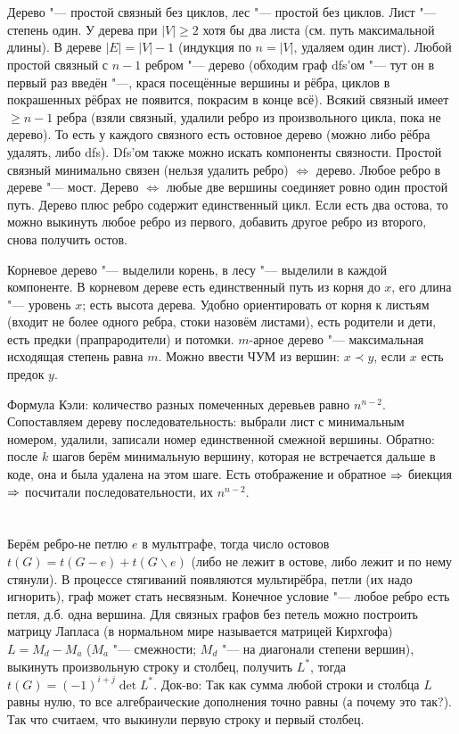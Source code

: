 \section{} %
Дерево "--- простой связный без циклов, лес "--- простой без циклов.
Лист "--- степень один.
У дерева при $|V|\ge 2$ хотя бы два листа (см. путь максимальной длины).
В дереве $|E|=|V|-1$ (индукция по $n=|V|$, удаляем один лист).
Любой простой связный с $n-1$ ребром "--- дерево (обходим граф dfs'ом "--- тут он в первый раз введён "---, крася посещённые вершины и рёбра, циклов в покрашенных
рёбрах не появится, покрасим в конце всё).
Всякий связный имеет $\ge n-1$ ребра (взяли связный, удалили ребро из произвольного цикла, пока не дерево).
То есть у каждого связного есть остовное дерево (можно либо рёбра удалять, либо dfs).
Dfs'ом также можно искать компоненты связности.
Простой связный минимально связен (нельзя удалить ребро) $\iff$ дерево.
Любое ребро в дереве "--- мост.
Дерево $\iff$ любые две вершины соединяет ровно один простой путь.
Дерево плюс ребро содержит единственный цикл.
Если есть два остова, то можно выкинуть любое ребро из первого, добавить другое ребро из второго, снова получить остов.

Корневое дерево "--- выделили корень, в лесу "--- выделили в каждой компоненте.
В корневом дереве есть единственный путь из корня до $x$, его длина "--- уровень $x$;
есть высота дерева.
Удобно ориентировать от корня к листьям (входит не более одного ребра, стоки назовём листами),
есть родители и дети, есть предки (прапрародители) и потомки.
$m$-арное дерево "--- максимальная исходящая степень равна $m$.
Можно ввести ЧУМ из вершин: $x \prec y$, если $x$ есть предок $y$.

Формула Кэли: количество разных помеченных деревьев равно $n^{n-2}$.
Сопоставляем дереву последовательность: выбрали лист с минимальным номером, удалили,
записали номер единственной смежной вершины.
Обратно: после $k$ шагов берём минимальную вершину, которая не встречается дальше в коде, она и была
удалена на этом шаге.
Есть отображение и обратное $\Rightarrow$ биекция $\Rightarrow$ посчитали последовательности, их $n^{n-2}$.

\section{} %
Берём ребро-не петлю $e$ в мультграфе, тогда число остовов $t(G)=t(G-e)+t(G\backslash e)$ (либо не лежит в остове, либо лежит и по нему стянули).
В процессе стягиваний появляются мультирёбра, петли (их надо игнорить), граф может стать несвязным.
Конечное условие "--- любое ребро есть петля, д.б. одна вершина.
Для связных графов без петель можно построить матрицу Лапласа (в нормальном мире называется матрицей Кирхгофа) $L=M_d-M_a$ ($M_a$ "--- смежности; $M_d$ "--- на диагонали степени вершин),
выкинуть произвольную строку и столбец, получить $L^*$, тогда $t(G)=(-1)^{i+j}\det L^*$.
Док-во:
Так как сумма любой строки и столбца $L$ равны нулю, то все алгебраические дополнения точно равны (\TODO а почему это так?).
Так что считаем, что выкинули первую строку и первый столбец.


